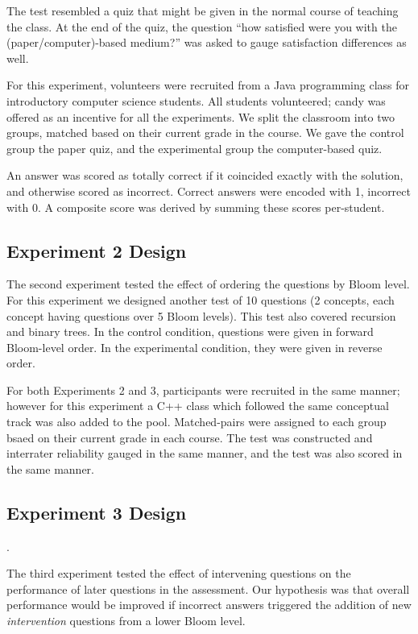 The test resembled a quiz that might be given in the normal course of teaching
the class. At the end of the quiz, the question ``how satisfied were you with
the (paper/computer)-based medium?'' was asked to gauge satisfaction
differences as well.

For this experiment, volunteers were recruited from a Java programming class
for introductory computer science students.  All students volunteered; candy
was offered as an incentive for all the experiments.  We split the classroom
into two groups, matched based on their current grade in the course.  We gave
the control group the paper quiz, and the experimental group the computer-based
quiz.

An answer was scored as totally correct if it coincided exactly with the
solution, and otherwise scored as incorrect. Correct answers were encoded with
1, incorrect with 0.  A composite score was derived by summing these scores
per-student.

\subsection{Experiment 2 Design}

The second experiment tested the effect of ordering the questions by Bloom
level.  For this experiment we designed another test of 10 questions (2
concepts, each concept having questions over 5 Bloom levels).  This test also
covered recursion and binary trees. In the control condition, questions were
given in forward Bloom-level order.  In the experimental condition, they were
given in reverse order.

For both Experiments 2 and 3, participants were recruited in the same manner;
however for this experiment a C++ class which followed the same conceptual
track was also added to the pool. Matched-pairs were assigned to each group
bsaed on their current grade in each course.  The test was constructed and
interrater reliability gauged in the same manner, and the test was also scored
in the same manner.

\subsection{Experiment 3 Design}. 

The third experiment tested the effect of intervening questions on the
performance of later questions in the assessment.  Our hypothesis was that
overall performance would be improved if incorrect answers triggered the
addition of new {\em intervention} questions from a lower Bloom level.

